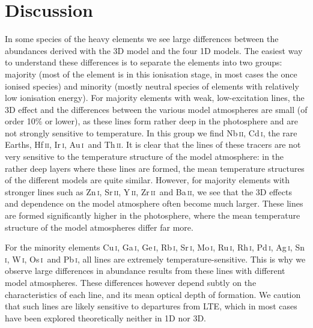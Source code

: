 \documentclass[traditabstract]{aa}
\newcommand{\altcui}{Cu\,\textsc{i}}
\newcommand{\altzni}{Zn\,\textsc{i}}
\newcommand{\altgai}{Ga\,\textsc{i}}
\newcommand{\altgei}{Ge\,\textsc{i}}
\newcommand{\altrbi}{Rb\,\textsc{i}}
\newcommand{\altsri}{Sr\,\textsc{i}}
\newcommand{\altsrii}{Sr\,\textsc{ii}}
\newcommand{\altyii}{Y\,\textsc{ii}}
\newcommand{\altzrii}{Zr\,\textsc{ii}}
\newcommand{\altnbii}{Nb\,\textsc{ii}}
\newcommand{\altmoi}{Mo\,\textsc{i}}
\newcommand{\altrui}{Ru\,\textsc{i}}
\newcommand{\altrhi}{Rh\,\textsc{i}}
\newcommand{\altpdi}{Pd\,\textsc{i}}
\newcommand{\altagi}{Ag\,\textsc{i}}
\newcommand{\altsni}{Sn\,\textsc{i}}
\newcommand{\altbaii}{Ba\,\textsc{ii}}
\newcommand{\altosi}{Os\,\textsc{i}}
\newcommand{\altiri}{Ir\,\textsc{i}}
\newcommand{\altaui}{Au\,\textsc{i}}
\newcommand{\altpbi}{Pb\,\textsc{i}}
\newcommand{\altthii}{Th\,\textsc{ii}}
\newcommand{\altwi}{W\,\textsc{i}}
\newcommand{\altcdi}{Cd\,\textsc{i}}
\newcommand{\althfii}{Hf\,\textsc{ii}}
\newcommand{\zrii}{\altzrii\ }
\newcommand{\osi}{\altosi\ }
\newcommand{\aui}{\altaui\ }
\begin{document}
\section{Discussion}
\label{discussion}

In some species of the heavy elements we see large differences between the abundances derived with the 3D model and the four 1D models.  The easiest way to understand these differences is to separate the elements into two groups: majority (most of the element is in this ionisation stage, in most cases the once ionised species) and minority (mostly neutral species of elements with relatively low ionisation energy).  For majority elements with weak, low-excitation lines, the 3D effect and the differences between the various model atmospheres are small (of order 10$\%$ or lower), as these lines form rather deep in the photosphere and are not strongly sensitive to temperature.  In this group we find \altnbii, \altcdi, the rare Earths, \althfii, \altiri, \aui and \altthii. It is clear that the lines of these tracers are not very sensitive to the temperature structure of the model atmosphere: in the rather deep layers where these lines are formed, the mean temperature structures of the different models are quite similar.  However, for majority elements with stronger lines such as \altzni, \altsrii, \altyii, \zrii and \altbaii, we see that the 3D effects and dependence on the model atmosphere often become much larger.  These lines are formed significantly higher in the photosphere, where the mean temperature structure of the model atmospheres differ far more.  

For the minority elements \altcui, \altgai, \altgei, \altrbi, \altsri, \altmoi, \altrui, \altrhi, \altpdi, \altagi, \altsni, \altwi, \osi and \altpbi, all lines are extremely temperature-sensitive.  This is why we observe large differences in abundance results from these lines with different model atmospheres.  These differences however depend subtly on the characteristics of each line, and its mean optical depth of formation. We caution that such lines are likely sensitive to departures from LTE, which in most cases have been explored theoretically neither in 1D nor 3D. 
\end{document}
